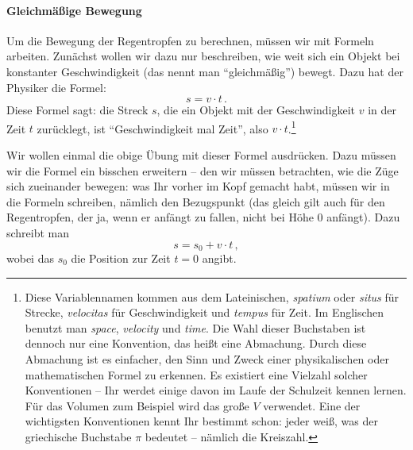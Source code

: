 \paragraph{Gleichmäßige Bewegung}

Um die Bewegung der Regentropfen zu berechnen, müssen wir mit Formeln arbeiten. Zunächst wollen wir dazu nur beschreiben, wie weit sich ein Objekt bei konstanter Geschwindigkeit (das nennt man ``gleichmäßig'') bewegt. Dazu hat der Physiker die Formel:
\begin{equation*}
    s = v\cdot t\,.
\end{equation*}
Diese Formel sagt: die Streck $s$, die ein Objekt mit der Geschwindigkeit $v$ in der Zeit $t$ zurücklegt, ist ``Geschwindigkeit mal Zeit'', also $v\cdot t$.\footnote{%
    Diese Variablennamen kommen aus dem Lateinischen, \emph{spatium} oder \emph{situs} für Strecke, \emph{velocitas} für Geschwindigkeit und \emph{tempus} für Zeit. Im Englischen benutzt man \emph{space}, \emph{velocity} und \emph{time}. Die Wahl dieser Buchstaben ist dennoch nur eine Konvention, das heißt eine Abmachung. Durch diese Abmachung ist es einfacher, den Sinn und Zweck einer physikalischen oder mathematischen Formel zu erkennen. Es existiert eine Vielzahl solcher Konventionen -- Ihr werdet einige davon im Laufe der Schulzeit kennen lernen. Für das Volumen zum Beispiel wird das große $V$ verwendet. Eine der wichtigsten Konventionen kennt Ihr bestimmt schon: jeder weiß, was der griechische Buchstabe $\pi$ bedeutet -- nämlich die Kreiszahl.}

Wir wollen einmal die obige Übung mit dieser Formel ausdrücken. Dazu müssen wir die Formel ein bisschen erweitern -- den wir müssen betrachten, wie die Züge sich zueinander bewegen: was Ihr vorher im Kopf gemacht habt, müssen wir in die Formeln schreiben, nämlich den Bezugspunkt (das gleich gilt auch für den Regentropfen, der ja, wenn er anfängt zu fallen, nicht bei Höhe 0 anfängt). Dazu schreibt man
\begin{equation*}
    s = s_0 + v\cdot t\,,
\end{equation*}
wobei das $s_0$ die Position zur Zeit $t=0$ angibt.

